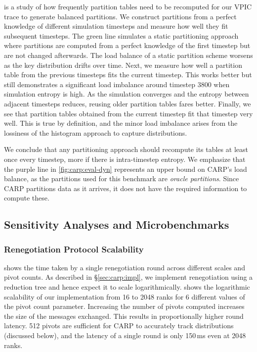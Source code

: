  is a study of how frequently partition tables need to be recomputed for
our VPIC trace to generate balanced partitions.
We construct partitions from a perfect knowledge of different simulation timesteps and measure how
well they fit subsequent timesteps.
The green line simulates a static partitioning approach where partitions are computed from a
perfect knowledge of the first timestep but are not changed afterwards.
The load balance of a static partition scheme worsens as the key distribution drifts over time.
Next, we measure how well a partition table from the previous timesteps fits the current timestep.
This works better but still demonstrates a significant load imbalance around timestep 3800 when
simulation entropy is high.
As the simulation converges and the entropy between adjacent timesteps reduces, reusing older
partition tables fares better.
Finally, we see that partition tables obtained from the current timestep fit that timestep very
well.
This is true by definition, and the minor load imbalance arises from the lossiness of the histogram
approach to capture distributions.

We conclude that any partitioning approach should recompute its tables at least once every
timestep, more if there is intra-timestep entropy.
We emphasize that the purple line in \cref{fig:carp:eval-dyn} represents an upper bound on CARP's
load balance, as the partitions used for this benchmark are \emph{oracle partitions}.
Since CARP partitions data as it arrives, it does not have the required information to compute
these.

\subsection{Sensitivity Analyses and Microbenchmarks}
\label{sec:carp:eval_mb}

\subsubsection{Renegotiation Protocol Scalability}
\label{sec:carp:eval_rtpscal}

\figCarpEvalRtpLat

 shows the time taken by a single renegotiation round across different
scales and pivot counts.
As described in \S\ref{sec:carp:impl}, we implement renegotiation using a reduction tree and hence
expect it to scale logarithmically.
 shows the logarithmic scalability of our implementation from 16 to 2048
ranks for 6 different values of the pivot count parameter.
Increasing the number of pivots computed increases the size of the messages exchanged.
This results in proportionally higher round latency.
512 pivots are sufficient for CARP to accurately track distributions (discussed below), and the
latency of a single round is only 150\,ms even at 2048 ranks.

